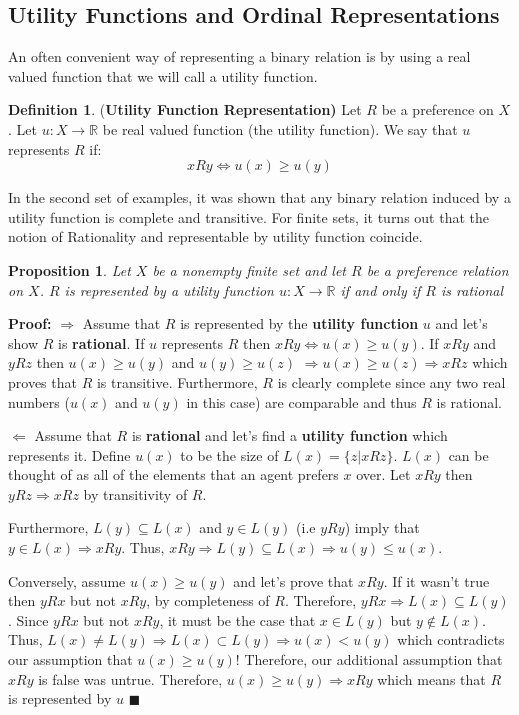\documentclass[12pt]{article}
\theoremstyle{plain}
\newtheorem{prop}{Proposition}[section]
\theoremstyle{definition}
\newtheorem{defin}{Definition}[subsection]
\theoremstyle{remark}
\newcommand{\tn}[1]{\textnormal{#1}}
\newcommand{\3}{\vspace*{3mm}}
\newcommand{\name}[1]{\tn{(\textbf{#1)}}}
\newcommand{\RR}{\mathbb{R}}
\newcommand{\RIGHT}{\Longrightarrow}
\newcommand{\LEFT}{\Longleftarrow}
\newcommand{\IFF}{\Longleftrightarrow}
\newcommand{\QED}{\blacksquare}
\newcommand{\Proof}{\textbf{Proof:} \hspace*{0.25mm}}
\begin{document}
\subsection{Utility Functions and Ordinal Representations}

An often convenient way of representing a binary relation is by using a real valued function that we will call a utility function.

\begin{defin} \name{Utility Function Representation}
Let $R$ be a preference on $X$. Let $u : X \to \RR$ be real valued function (the utility function). We say that $u$ represents $R$ if:
\[x R y \IFF u(x) \geq u(y)\]

\end{defin}

In the second set of examples, it was shown that any binary relation induced by a utility function is complete and transitive. For finite sets, it turns out that the notion of Rationality and representable by utility function coincide. 
\begin{prop} Let $X$ be a nonempty finite set and let $R$ be a preference relation on $X$. $R$ is represented by a utility function $u:X \to \RR$ if and only if $R$ is rational
\end{prop}

\Proof $\RIGHT$ Assume that $R$ is represented by the \textbf{utility function} $u$ and let's show $R$ is \textbf{rational}. If $u$ represents $R$ then $x R y \IFF u(x) \geq u(y)$. If $x R y$ and $y R z$ then $u(x) \geq u(y)$ and $u(y) \geq u(z)$ $\RIGHT u(x) \geq u(z) \RIGHT x R z$ which proves that $R$ is transitive. Furthermore, $R$ is clearly complete since any two real numbers ($u(x)$ and $u(y)$ in this case) are comparable and thus $R$ is rational. 


$\LEFT$  Assume that $R$ is \textbf{rational} and let's find a \textbf{utility function} which represents it. Define $u(x)$ to be the size of $L(x) = \{z | x R z\}$. $L(x)$ can be thought of as all of the elements that an agent prefers $x$ over. Let $x R y$ then $y R z \RIGHT x R z$ by transitivity of $R$. 


Furthermore, $L(y) \subseteq L(x)$ and $y \in L(y)$ (i.e $y R y$) imply that  $y \in L(x) \RIGHT x R y$. Thus, $x R y \RIGHT L(y) \subseteq L(x) \RIGHT u(y) \leq u(x) $. 


\quad Conversely, assume $u(x) \geq u(y)$ and let's prove that $x R y$. If it wasn't true then $y R x$ but not $x R y$, by completeness of $R$. Therefore, $y R x \RIGHT L(x) \subseteq L(y)$. Since $y R x$ but not $x R y$, it must be the case that $x \in L(y)$ but $y \notin L(x)$. Thus, $L(x) \neq L(y) \RIGHT L(x) \subset L(y) \RIGHT u(x) < u(y)$ which contradicts our assumption that $u(x) \geq u(y)$! Therefore, our additional assumption that $x R y$ is false was untrue. Therefore, $u(x) \geq u(y) \RIGHT x R y$ which means that $R$ is represented by $u$ $\QED$
\end{document}
